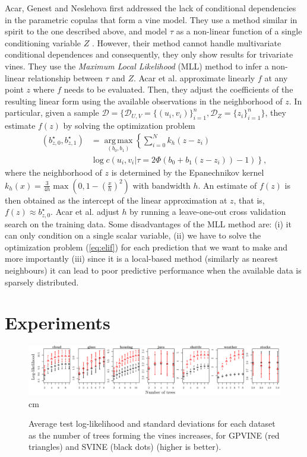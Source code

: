 \documentclass{article}
\begin{document}
Acar, Genest and Neslehova  first addressed the lack
of conditional dependencies in the parametric copulas that form a vine model.
They use a method similar in spirit to the one described above, and model
$\tau$ as a non-linear function of a single conditioning variable $Z$
\cite{Acar2011}.  However, their method cannot handle multivariate conditional
dependences and consequently, they only show results for trivariate vines.
They use the \emph{Maximum Local Likelihood} (MLL) method to infer a non-linear
relationship between $\tau$ and $Z$. Acar et al.
approximate linearly $f$ at any point $z$ where $f$ needs to be evaluated.
Then, they adjust the coefficients of the resulting linear form using the
available observations in the neighborhood of $z$.  In particular, given a
sample $\mathcal{D} = \{ \mathcal{D}_{U,V} = \{(u_i, v_i)\}_{i=1}^n,
\mathcal{D}_Z = \{z_i\}_{i=1}^n\}$, they estimate $f(z)$ by solving the
optimization problem
\begin{align}
(b_{z,0}^\star, b_{z,1}^\star) &= \operatorname*{arg\,max}_{(b_0, b_1) } \left\{ \sum_{i=0}^N k_h(z-z_i)  \right.\nonumber\\
& \left. \log c(u_i,v_i| \tau = 2 \Phi(b_0 + b_1(z-z_i)) - 1)\right\},\label{eq:elif}
\end{align}
where the neighborhood of $z$ is determined by the Epanechnikov kernel $k_h(x)
= \frac{3}{4h}\max (0, 1-(\frac{x}{h})^2)$ with bandwidth $h$. An estimate of
$f(z)$ is then obtained as the intercept of the linear approximation at $z$,
that is, $f(z) \approx b_{z,0}^\star$.  Acar et al. adjust $h$ by running a
leave-one-out cross validation search on the training data.  Some disadvantages
of the MLL method are: (i) it can only condition on a single scalar variable,
(ii) we have to solve the optimization problem (\ref{eq:elif}) for each
prediction that we want to make and more importantly (iii) since it is a
local-based method (similarly as nearest neighbours) it can lead to poor
predictive performance when the available data is sparsely distributed.

\section{Experiments}\label{sec:experiments}

\begin{figure}
  \includegraphics[width=\textwidth]{figures/bars.pdf}
   cm
  \caption{Average test log-likelihood and standard deviations for each dataset
  as the number of trees forming the vines increases, for GPVINE (red
  triangles) and SVINE (black dots) (higher is better).}
  \label{fig:bars}
\end{figure}
\end{document}
